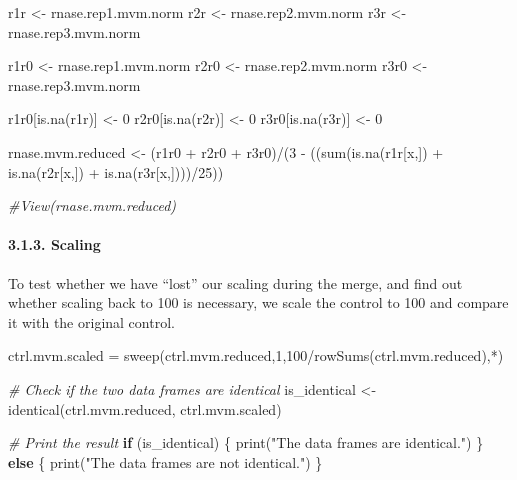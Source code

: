 \documentclass[
]{article}
\newenvironment{Shaded}{\begin{snugshade}}{\end{snugshade}}
\newcommand{\CommentTok}[1]{\textcolor[rgb]{0.56,0.35,0.01}{\textit{#1}}}
\newcommand{\ControlFlowTok}[1]{\textcolor[rgb]{0.13,0.29,0.53}{\textbf{#1}}}
\newcommand{\DecValTok}[1]{\textcolor[rgb]{0.00,0.00,0.81}{#1}}
\newcommand{\FunctionTok}[1]{\textcolor[rgb]{0.00,0.00,0.00}{#1}}
\newcommand{\NormalTok}[1]{#1}
\newcommand{\OtherTok}[1]{\textcolor[rgb]{0.56,0.35,0.01}{#1}}
\newcommand{\SpecialCharTok}[1]{\textcolor[rgb]{0.00,0.00,0.00}{#1}}
\newcommand{\StringTok}[1]{\textcolor[rgb]{0.31,0.60,0.02}{#1}}
\begin{document}
\begin{Shaded}
\begin{Highlighting}[]
\NormalTok{r1r }\OtherTok{\textless{}{-}}\NormalTok{ rnase.rep1.mvm.norm}
\NormalTok{r2r }\OtherTok{\textless{}{-}}\NormalTok{ rnase.rep2.mvm.norm}
\NormalTok{r3r }\OtherTok{\textless{}{-}}\NormalTok{ rnase.rep3.mvm.norm}

\NormalTok{r1r0 }\OtherTok{\textless{}{-}}\NormalTok{ rnase.rep1.mvm.norm}
\NormalTok{r2r0 }\OtherTok{\textless{}{-}}\NormalTok{ rnase.rep2.mvm.norm}
\NormalTok{r3r0 }\OtherTok{\textless{}{-}}\NormalTok{ rnase.rep3.mvm.norm}

\NormalTok{r1r0[}\FunctionTok{is.na}\NormalTok{(r1r)] }\OtherTok{\textless{}{-}} \DecValTok{0}
\NormalTok{r2r0[}\FunctionTok{is.na}\NormalTok{(r2r)] }\OtherTok{\textless{}{-}} \DecValTok{0}
\NormalTok{r3r0[}\FunctionTok{is.na}\NormalTok{(r3r)] }\OtherTok{\textless{}{-}} \DecValTok{0}

\NormalTok{rnase.mvm.reduced }\OtherTok{\textless{}{-}}\NormalTok{  (r1r0 }\SpecialCharTok{+}\NormalTok{ r2r0 }\SpecialCharTok{+}\NormalTok{ r3r0)}\SpecialCharTok{/}\NormalTok{(}\DecValTok{3} \SpecialCharTok{{-}}\NormalTok{ ((}\FunctionTok{sum}\NormalTok{(}\FunctionTok{is.na}\NormalTok{(r1r[x,]) }\SpecialCharTok{+} \FunctionTok{is.na}\NormalTok{(r2r[x,]) }\SpecialCharTok{+} \FunctionTok{is.na}\NormalTok{(r3r[x,])))}\SpecialCharTok{/}\DecValTok{25}\NormalTok{))}
                        

\CommentTok{\#View(rnase.mvm.reduced)}
\end{Highlighting}
\end{Shaded}

\hypertarget{scaling}{%
\paragraph{3.1.3. Scaling}\label{scaling}}

To test whether we have ``lost'' our scaling during the merge, and find
out whether scaling back to 100 is necessary, we scale the control to
100 and compare it with the original control.

\begin{Shaded}
\begin{Highlighting}[]
\NormalTok{ctrl.mvm.scaled }\OtherTok{=} 
  \FunctionTok{sweep}\NormalTok{(ctrl.mvm.reduced,}\DecValTok{1}\NormalTok{,}\DecValTok{100}\SpecialCharTok{/}\FunctionTok{rowSums}\NormalTok{(ctrl.mvm.reduced),}\StringTok{\textquotesingle{}*\textquotesingle{}}\NormalTok{)}

\CommentTok{\# Check if the two data frames are identical}
\NormalTok{is\_identical }\OtherTok{\textless{}{-}} \FunctionTok{identical}\NormalTok{(ctrl.mvm.reduced, ctrl.mvm.scaled)}

\CommentTok{\# Print the result}
\ControlFlowTok{if}\NormalTok{ (is\_identical) \{}
  \FunctionTok{print}\NormalTok{(}\StringTok{"The data frames are identical."}\NormalTok{)}
\NormalTok{ \} }\ControlFlowTok{else}\NormalTok{ \{}
  \FunctionTok{print}\NormalTok{(}\StringTok{"The data frames are not identical."}\NormalTok{)}
\NormalTok{ \}}
\end{Highlighting}
\end{Shaded}
\end{document}
